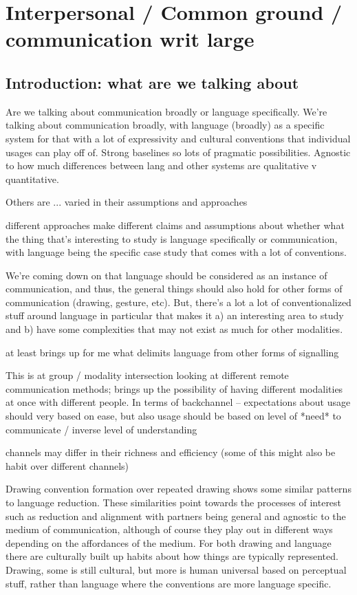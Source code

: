 \documentclass[]{article}
\begin{document}
\section{Interpersonal / Common ground / communication writ large}

\subsection{Introduction: what are we talking about}
Are we talking about communication broadly or language specifically. 
We're talking about communication broadly, with language (broadly) as a specific system for that with a lot of expressivity and cultural conventions that individual usages can play off of. Strong baselines so lots of pragmatic possibilities. 
Agnostic to how much differences between lang and other systems are qualitative v quantitative. 

Others are ... varied in their assumptions and approaches 

different approaches make different claims and assumptions about whether what the thing that's interesting to study is language specifically or communication, with language being the specific case study that comes with a lot of conventions. 

We're coming down on that language should be considered as an instance of communication, and thus, the general things should also hold for other forms of communication (drawing, gesture, etc). But, there's a lot a lot of conventionalized stuff around language in particular that makes it a) an interesting area to study and b) have some complexities that may not exist as much for other modalities. 

\cite{clark1996} at least brings up for me what delimits language from other forms of signalling

This is at group / modality intersection \cite{foxtree2013} looking at different remote communication methods; brings up the possibility of having different modalities at once with different people. In terms of backchannel -- expectations about usage should very based on ease, but also usage should be based on level of *need* to communicate / inverse level of understanding 

channels may differ in their richness and efficiency (some of this might also be habit over different channels)

\cite{hawkinsa} Drawing convention formation over repeated drawing shows some similar patterns to language reduction. These similarities point towards the processes of interest such as reduction and alignment with partners being general and agnostic to the medium of communication, although of course they play out in different ways depending on the affordances of the medium. For both drawing and language there are culturally built up habits about how things are typically represented. Drawing, some is still cultural, but more is human universal based on perceptual stuff, rather than language where the conventions are more language specific. 
\end{document}
